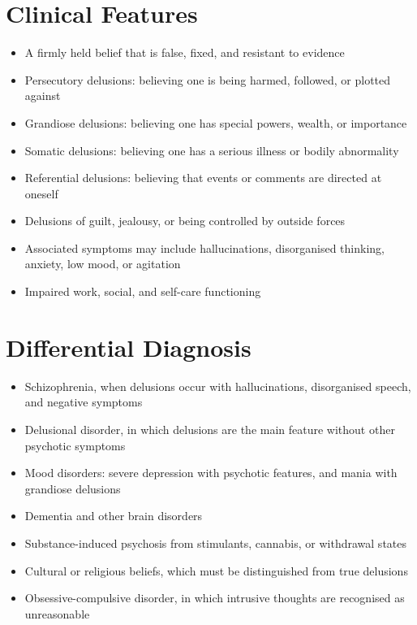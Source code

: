 \section*{Clinical Features}
\begin{itemize}
    \item A firmly held belief that is false, fixed, and resistant to evidence
    \item Persecutory delusions: believing one is being harmed, followed, or plotted against
    \item Grandiose delusions: believing one has special powers, wealth, or importance
    \item Somatic delusions: believing one has a serious illness or bodily abnormality
    \item Referential delusions: believing that events or comments are directed at oneself
    \item Delusions of guilt, jealousy, or being controlled by outside forces
    \item Associated symptoms may include hallucinations, disorganised thinking, anxiety, low mood, or agitation
    \item Impaired work, social, and self-care functioning
\end{itemize}

\section*{Differential Diagnosis}
\begin{itemize}
    \item Schizophrenia, when delusions occur with hallucinations, disorganised speech, and negative symptoms
    \item Delusional disorder, in which delusions are the main feature without other psychotic symptoms
    \item Mood disorders: severe depression with psychotic features, and mania with grandiose delusions
    \item Dementia and other brain disorders
    \item Substance-induced psychosis from stimulants, cannabis, or withdrawal states
    \item Cultural or religious beliefs, which must be distinguished from true delusions
    \item Obsessive-compulsive disorder, in which intrusive thoughts are recognised as unreasonable
\end{itemize}

